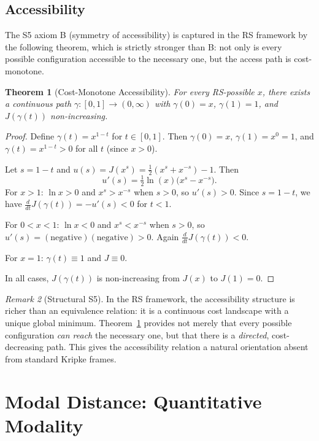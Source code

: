 \documentclass[12pt,a4paper]{article}
\newtheorem{theorem}{Theorem}[section]
\theoremstyle{definition}
\theoremstyle{remark}
\newtheorem{remark}[theorem]{Remark}
\begin{document}
\subsection{Accessibility}

The S5 axiom B (symmetry of accessibility) is captured in the RS
framework by the following theorem, which is strictly stronger than B:
not only is every possible configuration accessible to the necessary
one, but the access path is cost-monotone.

\begin{theorem}[Cost-Monotone Accessibility]
\label{thm:B}
For every RS-possible $x$, there exists a continuous path
$\gamma : [0, 1] \to (0, \infty)$ with $\gamma(0) = x$,
$\gamma(1) = 1$, and $J(\gamma(t))$ non-increasing.
\end{theorem}

\begin{proof}
Define $\gamma(t) = x^{1-t}$ for $t \in [0, 1]$.  Then
$\gamma(0) = x$, $\gamma(1) = x^0 = 1$, and $\gamma(t) = x^{1-t} > 0$
for all $t$ (since $x > 0$).

Let $s = 1 - t$ and $u(s) = J(x^s) = \tfrac{1}{2}(x^s + x^{-s}) - 1$.
Then
\[
  u'(s) = \tfrac{1}{2}\ln(x)\bigl(x^s - x^{-s}\bigr).
\]
For $x > 1$: $\ln x > 0$ and $x^s > x^{-s}$ when $s > 0$, so
$u'(s) > 0$.  Since $s = 1 - t$, we have
$\frac{d}{dt} J(\gamma(t)) = -u'(s) < 0$ for $t < 1$.

For $0 < x < 1$: $\ln x < 0$ and $x^s < x^{-s}$ when $s > 0$, so
$u'(s) = (\text{negative})(\text{negative}) > 0$.  Again
$\frac{d}{dt} J(\gamma(t)) < 0$.

For $x = 1$: $\gamma(t) \equiv 1$ and $J \equiv 0$.

In all cases, $J(\gamma(t))$ is non-increasing from $J(x)$ to $J(1) = 0$.
\end{proof}

\begin{remark}[Structural S5]
In the RS framework, the accessibility structure is richer than an
equivalence relation: it is a continuous cost landscape with a unique
global minimum.  Theorem~\ref{thm:B} provides not merely that every
possible configuration \emph{can reach} the necessary one, but that
there is a \emph{directed}, cost-decreasing path.  This gives the
accessibility relation a natural orientation absent from standard Kripke
frames.
\end{remark}

\section{Modal Distance: Quantitative Modality}
\label{sec:distance}
\end{document}
